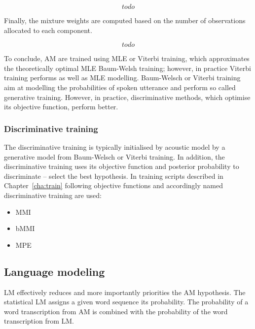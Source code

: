 {\begin{equation}\label{eq:var}
    todo
\end{equation}

Finally, the mixture weights are computed based on the number of observations allocated to each component.

\begin{equation}\label{eq:weights}
    todo
\end{equation}


To conclude, \ac{AM} are trained using \ac{MLE} or Viterbi training, which approximates the theoretically optimal \ac{MLE} Baum-Welsh training; however, in practice Viterbi training performs as well as \ac{MLE} modelling.
Baum-Welsch or Viterbi training aim at modelling the probabilities of spoken utterance and perform so called generative training.
However, in practice, discriminative methods, which optimise its objective function, perform better.

\subsubsection*{Discriminative training}
\label{sub:subsection_name}
The discriminative training is typically initialised by acoustic model by a generative model from Baum-Welsch or Viterbi training.
In addition, the discriminative training uses its objective function and posterior probability to discriminate -- select the best hypothesis.
In training scripts described in Chapter~\ref{cha:train} following objective functions and accordingly named discriminative training are used:
\begin{itemize}
    \item \acl{MMI}\cite{chow1990maximum} 
    \item \acl{bMMI}\cite{povey2008boosted}
    \item \acl{MPE}\cite{povey2003mmi}
\end{itemize}

\subsection{Language modeling}
\label{sub:lm}

\ac{LM} effectively reduces and more importantly priorities the \ac{AM} hypothesis.
The statistical \ac{LM} assigns a given word sequence its probability.
The probability of a word transcription from \ac{AM} is combined with
the probability of the word transcription from \ac{LM}.

}
